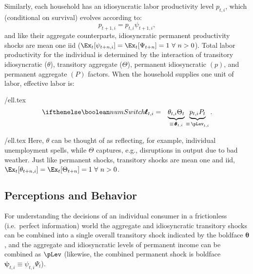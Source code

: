 Similarly, each household has an idiosyncratic labor productivity level $p_{t,i}$, which (conditional on survival) evolves according to:
\begin{equation}
  p_{t+1,i} = p_{t,i} \psi_{t+1,i},  \label{eq:IndRandWalk}
\end{equation}
and like their aggregate counterparts, idiosyncratic permanent productivity shocks are mean
one iid ($\Ex_{t}[\psi_{t+n,i}]=\Ex_{t}[\Psi_{t+n}]= 1~\forall ~n>0$).
Total labor productivity for the individual is determined by the interaction of transitory idiosyncratic
($\theta$), transitory aggregate ($\Theta$), permanent idiosyncratic $({p})$, and permanent aggregate
$({P})$ factors.  When the household supplies one unit of labor, effective labor is:
\begin{verbatimwrite}{\eq/ell.tex}
  \newcommand{\TranShocktpOne }{\Theta_{t}}
  \begin{eqnarray}
    \label{eq:ell}
    \ifnumSw  \pmb{\ell}_{t,i} & = & \underbrace{\theta_{t,i}\TranShocktpOne}_{\equiv\,\pmb{\theta}_{t,i}}\underbrace{{p}_{t,i} {P}_{t}}_{\equiv\,\pLev_{t,i}}.
  \end{eqnarray}
\end{verbatimwrite}
 {\eq/ell.tex} Here, $\theta$ can be thought of as reflecting, for example, individual unemployment spells, while $\Theta$ captures, e.g., disruptions in output due to bad weather.  Just like permanent shocks, transitory shocks are mean one and iid, $\Ex_{t}[\theta_{t+n,i}]=\Ex_{t}[\Theta_{t+n}]=1~\forall~n>0$.  


\subsection{Perceptions and Behavior}

For understanding the decisions of an individual consumer in a frictionless (i.e.\ perfect information) world the aggregate and idiosyncratic transitory shocks can be combined into a single overall transitory shock indicated by the boldface $\pmb{\theta}$, and the aggregate and idiosyncratic levels of permanent income can be combined as $\pLev$ (likewise, the combined permanent shock is boldface $\pmb{\psi}_{t,i}\equiv \psi_{t,i} \Psi_{t}$).


